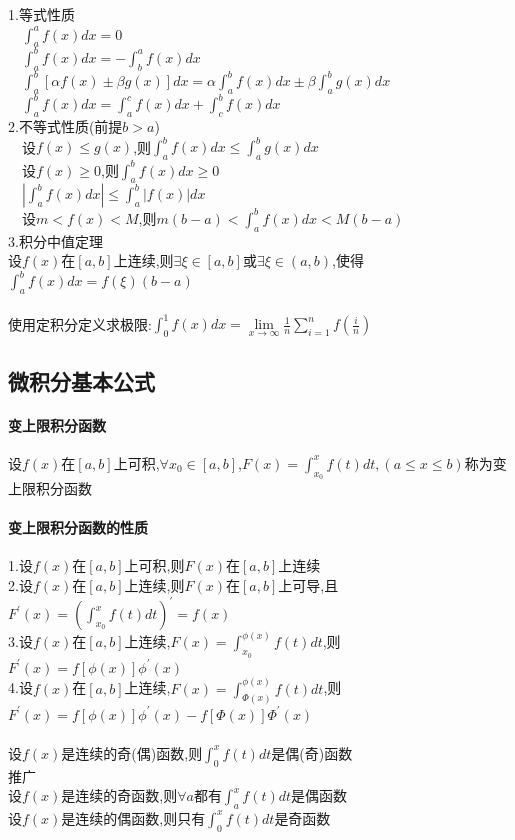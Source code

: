 \documentclass{article}
\begin{document}
\begin{flushleft}
	1.等式性质\\
	\ \ $\int_{a}^{a}f(x)dx=0$\\
	\ \ $\int_{a}^{b}f(x)dx=-\int_{b}^{a}f(x)dx$\\
	\ \ $\int_{a}^{b}[\alpha f(x)\pm \beta g(x)]dx=\alpha\int_{a}^{b}f(x)dx\pm \beta\int_{a}^{b}g(x)dx$\\
	\ \ $\int_{a}^{b}f(x)dx=\int_{a}^{c}f(x)dx+\int_{c}^{b}f(x)dx$\\
	2.不等式性质(前提$b>a$)\\
	\ \ 设$f(x)\le g(x)$,则$\int_{a}^{b}f(x)dx\le \int_{a}^{b}g(x)dx$\\
	\ \ 设$f(x)\ge 0$,则$\int_{a}^{b}f(x)dx \ge 0$\\
	\ \ $|\int_{a}^{b}f(x)dx| \le \int_{a}^{b}|f(x)|dx$\\
	\ \ 设$m<f(x)<M$,则$m(b-a)<\int_{a}^{b}f(x)dx<M(b-a)$\\
	3.积分中值定理\\
	设$f(x)$在$[a,b]$上连续,则$\exists \xi \in [a,b]$或$\exists \xi \in (a,b)$,使得$\int_{a}^{b}f(x)dx=f(\xi)(b-a)$\\
	~\\
	使用定积分定义求极限:$\int_{0}^{1}f(x)dx=\lim\limits_{x\to \infty}\frac{1}{n}\sum_{i=1}^{n}f(\frac{i}{n})$\\
	
	\subsection{微积分基本公式}
	
	\paragraph{变上限积分函数}
	设$f(x)$在$[a,b]$上可积,$\forall x_0\in [a,b]$,$F(x)=\int_{x_0}^{x}f(t)dt,(a\le x\le b)$称为变上限积分函数\\
	\paragraph{变上限积分函数的性质}
	1.设$f(x)$在$[a,b]$上可积,则$F(x)$在$[a,b]$上连续\\
	2.设$f(x)$在$[a,b]$上连续,则$F(x)$在$[a,b]$上可导,且$F^{'}(x)=(\int_{x_0}^{x}f(t)dt)^{'}=f(x)$\\
	3.设$f(x)$在$[a,b]$上连续,$F(x)=\int_{x_0}^{\phi(x)}f(t)dt$,则$F^{'}(x)=f[\phi(x)]\phi^{'}(x)$\\
	4.设$f(x)$在$[a,b]$上连续,$F(x)=\int_{\Phi(x)}^{\phi(x)}f(t)dt$,则$F^{'}(x)=f[\phi(x)]\phi^{'}(x)-f[\Phi(x)]\Phi^{'}(x)$\\
	~\\
	设$f(x)$是连续的奇(偶)函数,则$\int_{0}^{x}f(t)dt$是偶(奇)函数\\
	推广\\
	设$f(x)$是连续的奇函数,则$\forall a$都有$\int_{a}^{x}f(t)dt$是偶函数\\
	设$f(x)$是连续的偶函数,则只有$\int_{0}^{x}f(t)dt$是奇函数\\

\end{flushleft}
\end{document}
